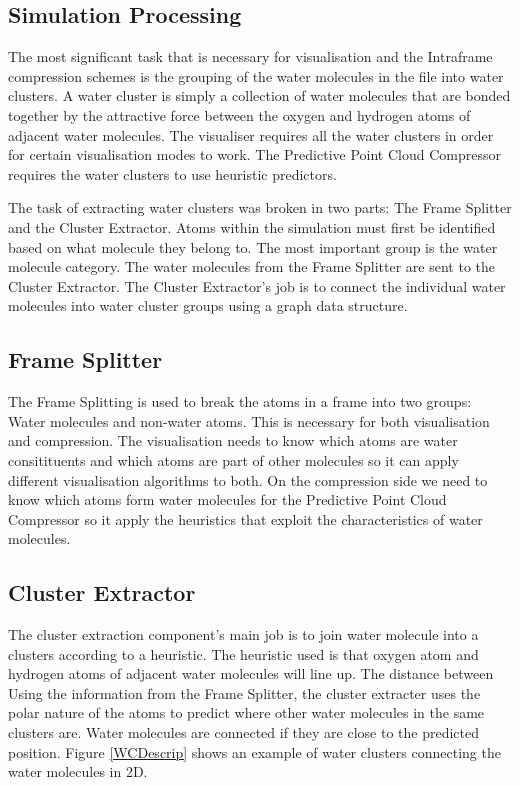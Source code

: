 \documentclass[a4paper,11pt]{report}
\begin{document}
\subsection{Simulation Processing}

The most significant task that is necessary for visualisation and the Intraframe compression schemes is the grouping of the water molecules in the file into water clusters. A water cluster is simply a collection of water molecules that are bonded together by the attractive force between the oxygen and hydrogen atoms of adjacent water molecules. The visualiser requires all the water clusters in order for certain visualisation modes to work. The Predictive Point Cloud Compressor requires the water clusters to use heuristic predictors. 

The task of extracting water clusters was broken in two parts: The Frame Splitter and the Cluster Extractor. Atoms within the simulation must first be identified based on what molecule they belong to. The most important group is the water molecule category. The water molecules from the Frame Splitter are sent to the Cluster Extractor. The Cluster Extractor's job is to connect the individual water molecules into water cluster groups using a graph data structure.

\subsection{Frame Splitter}

The Frame Splitting is used to break the atoms in a frame into two groups: Water molecules and non-water atoms. This is necessary for both visualisation and compression. The visualisation needs to know which atoms are water consitituents and which atoms are part of other molecules so it can apply different visualisation algorithms to both. On the compression side we need to know which atoms form water molecules for the Predictive Point Cloud Compressor so it apply the heuristics that exploit the characteristics of water molecules.

\subsection{Cluster Extractor}

The cluster extraction component's main job is to join water molecule into a clusters according to a heuristic. The heuristic used is that oxygen atom and hydrogen atoms of adjacent water molecules will line up. The distance between  Using the information from the Frame Splitter, the cluster extracter uses the polar nature of the atoms to predict where other water molecules in the same clusters are. Water molecules are connected if they are close to the predicted position. Figure \ref{WCDescrip} shows an example of water clusters connecting the water molecules in 2D.
\end{document}
